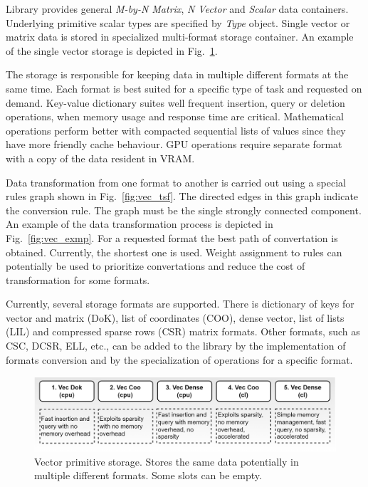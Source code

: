 Library provides general \textit{M-by-N Matrix}, \textit{N Vector} and \textit{Scalar} data containers.
Underlying primitive scalar types are specified by \textit{Type} object. 
Single vector or matrix data is stored in specialized multi-format storage container. An example of the single vector storage is depicted in Fig.~\ref{fig:vec_storage}. 

The storage is responsible for keeping data in multiple different formats at the same time. 
Each format is best suited for a specific type of task and requested on demand. 
Key-value dictionary suites well frequent insertion, query or deletion operations, when memory usage and response time are critical. 
Mathematical operations perform better with compacted sequential lists of values since they have more friendly cache behaviour. 
GPU operations require separate format with a copy of the data resident in VRAM.

Data transformation from one format to another is carried out using a special rules graph shown in Fig.~\ref{fig:vec_tsf}. 
The directed edges in this graph indicate the conversion rule. 
The graph must be the single strongly connected component. 
An example of the data transformation process is depicted in Fig.~\ref{fig:vec_exmp}. 
For a requested format the best path of convertation is obtained. Currently, the shortest one is used. 
Weight assignment to rules can potentially be used to prioritize convertations and reduce the cost of transformation for some formats. 

Currently, several storage formats are supported. 
There is dictionary of keys for vector and matrix (DoK), list of coordinates (COO), dense vector, list of lists (LIL) and compressed sparse rows (CSR) matrix formats.  
Other formats, such as CSC, DCSR, ELL, etc., can be added to the library by the implementation of formats conversion and by the specialization of operations for a specific format.

\begin{figure}[b]
\centering
\includegraphics[width=0.95\linewidth]{figures/vector_storage.png}
\caption{Vector primitive storage. Stores the same data potentially in multiple different formats. Some slots can be empty.}
\label{fig:vec_storage}
\end{figure}

